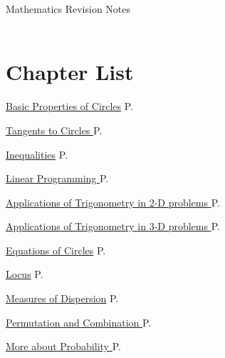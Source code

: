 \documentclass[12pt, a4paper]{article}
\begin{document}
\newpage
\newpage
\thispagestyle{empty}
\begin{center}
Mathematics Revision Notes\\\vspace{1cm}
\greybox{\fontsize{24pt}{24pt}\selectfont {S5 Chapters}} \\\vspace{1cm}
\end{center}
\vspace{0.5cm}
\hline
\section*{Chapter List}
\begin{enumx}[label=Ch \arabic*. , leftmargin=2cm,rightmargin=0pt,labelwidth=17mm, itemsep=3pt, topsep=3mm, labelsep=2mm, labelindent=0pt, align=left, partopsep=0mm ]
\item \hyperref[chapter:S5-1]{Basic Properties of Circles} \hfill P.\pageref{chapter:S5-1}
\item \hyperref[chapter:S5-2]{Tangents to Circles \NF} \hfill P.\pageref{chapter:S5-2}
\item \hyperref[chapter:S5-3]{Inequalities} \hfill P.\pageref{chapter:S5-3}
\item \hyperref[chapter:S5-4]{Linear Programming \NF} \hfill P.\pageref{chapter:S5-4}
\item \hyperref[chapter:S5-5]{Applications of Trigonometry in 2-D problems \NF} \hfill P.\pageref{chapter:S5-5}
\item \hyperref[chapter:S5-6]{Applications of Trigonometry in 3-D problems \NF} \hfill P.\pageref{chapter:S5-6}
\item \hyperref[chapter:S5-7]{Equations of Circles} \hfill P.\pageref{chapter:S5-7}
\item \hyperref[chapter:S5-8]{Locus} \hfill P.\pageref{chapter:S5-8}
\item \hyperref[chapter:S5-9]{Measures of Dispersion} \hfill P.\pageref{chapter:S5-9}
\item \hyperref[chapter:S5-10]{Permutation and Combination \NF} \hfill P.\pageref{chapter:S5-10}
\item \hyperref[chapter:S5-11]{More about Probability \NF} \hfill P.\pageref{chapter:S5-11}
\end{enumx}
\end{document}
